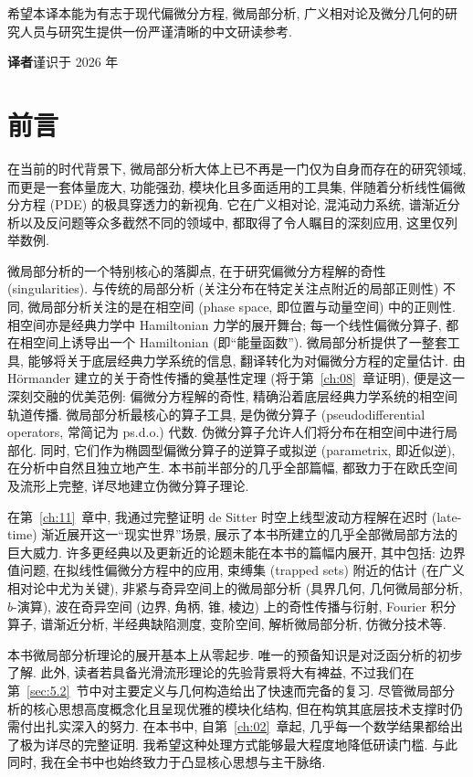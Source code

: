 希望本译本能为有志于现代偏微分方程, 微局部分析, 广义相对论及微分几何的研究人员与研究生提供一份严谨清晰的中文研读参考.

\vspace{1.5em}
\hfill \textbf{译者}\quad 谨识于 2026 年

\cleardoublepage

\chapter*{前言}

在当前的时代背景下, 微局部分析大体上已不再是一门仅为自身而存在的研究领域, 而更是一套体量庞大, 功能强劲, 模块化且多面适用的工具集, 伴随着分析线性偏微分方程 (PDE) 的极具穿透力的新视角. 它在广义相对论, 混沌动力系统, 谱渐近分析以及反问题等众多截然不同的领域中, 都取得了令人瞩目的深刻应用, 这里仅列举数例.

微局部分析的一个特别核心的落脚点, 在于研究偏微分方程解的奇性 (singularities). 与传统的局部分析 (关注分布在特定关注点附近的局部正则性) 不同, 微局部分析关注的是在相空间 (phase space, 即位置与动量空间) 中的正则性. 相空间亦是经典力学中 Hamiltonian 力学的展开舞台; 每一个线性偏微分算子, 都在相空间上诱导出一个 Hamiltonian (即``能量函数''). 微局部分析提供了一整套工具, 能够将关于底层经典力学系统的信息, 翻译转化为对偏微分方程的定量估计. 由 Hörmander 建立的关于奇性传播的奠基性定理 (将于第~\ref{ch:08}~章证明), 便是这一深刻交融的优美范例: 偏微分方程解的奇性, 精确沿着底层经典力学系统的相空间轨道传播. 微局部分析最核心的算子工具, 是伪微分算子 (pseudodifferential operators, 常简记为 ps.d.o.) 代数. 伪微分算子允许人们将分布在相空间中进行局部化. 同时, 它们作为椭圆型偏微分算子的逆算子或拟逆 (parametrix, 即近似逆), 在分析中自然且独立地产生. 本书前半部分的几乎全部篇幅, 都致力于在欧氏空间及流形上完整, 详尽地建立伪微分算子理论.

在第~\ref{ch:11}~章中, 我通过完整证明 de Sitter 时空上线型波动方程解在迟时 (late-time) 渐近展开这一``现实世界''场景, 展示了本书所建立的几乎全部微局部方法的巨大威力. 许多更经典以及更新近的论题未能在本书的篇幅内展开, 其中包括: 边界值问题, 在拟线性偏微分方程中的应用, 束缚集 (trapped sets) 附近的估计 (在广义相对论中尤为关键), 非紧与奇异空间上的微局部分析 (具界几何, 几何微局部分析, $b$-演算), 波在奇异空间 (边界, 角柄, 锥, 棱边) 上的奇性传播与衍射, Fourier 积分算子, 谱渐近分析, 半经典缺陷测度, 变阶空间, 解析微局部分析, 仿微分技术等.

本书微局部分析理论的展开基本上从零起步. 唯一的预备知识是对泛函分析的初步了解. 此外, 读者若具备光滑流形理论的先验背景将大有裨益, 不过我们在第~\ref{sec:5.2}~节中对主要定义与几何构造给出了快速而完备的复习. 尽管微局部分析的核心思想高度概念化且呈现优雅的模块化结构, 但在构筑其底层技术支撑时仍需付出扎实深入的努力. 在本书中, 自第~\ref{ch:02}~章起, 几乎每一个数学结果都给出了极为详尽的完整证明. 我希望这种处理方式能够最大程度地降低研读门槛. 与此同时, 我在全书中也始终致力于凸显核心思想与主干脉络.

